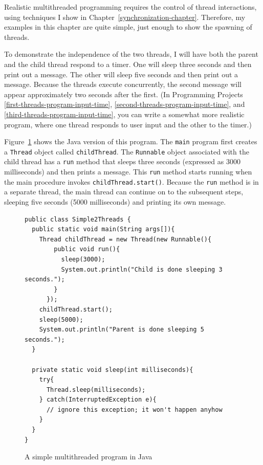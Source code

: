 Realistic multithreaded programming requires the control of thread
interactions, using techniques I show in
Chapter~\ref{synchronization-chapter}.  Therefore, my examples in
this chapter are quite simple, just enough to show the spawning of
threads.

To demonstrate the independence of the two threads, I will have both
the parent and the child thread respond to a timer.  One will sleep
three seconds and then print out a message.  The other will sleep five
seconds and then print out a message.  Because the threads execute
concurrently, the second message will appear approximately two seconds
after the first.  (In Programming Projects
\ref{first-threads-program-input-time},
\ref{second-threads-program-input-time}, and \ref{third-threads-program-input-time},
you can write a somewhat
more realistic program, where one thread responds to user input and
the other to the timer.)

Figure~\ref{Simple2Threads} shows the Java version of this program.
The \verb|main| program first creates a
\verb|Thread| object called
\verb|childThread|.  The
\verb|Runnable| object associated
with the child thread has a \verb|run| method that sleeps three
seconds (expressed as 3000
milliseconds) and then prints a message.  This \verb|run| method starts
running when the main procedure invokes \verb|childThread.start()|.
Because the \verb|run| method is in a separate thread, the main thread
can continue on to the subsequent steps, sleeping five seconds (5000 milliseconds)
and printing its own message.
\begin{figure}
\begin{verbatim}
public class Simple2Threads {
  public static void main(String args[]){
    Thread childThread = new Thread(new Runnable(){
        public void run(){
          sleep(3000);
          System.out.println("Child is done sleeping 3 seconds.");
        }
      });
    childThread.start();
    sleep(5000);
    System.out.println("Parent is done sleeping 5 seconds.");
  }

  private static void sleep(int milliseconds){
    try{
      Thread.sleep(milliseconds);
    } catch(InterruptedException e){
      // ignore this exception; it won't happen anyhow
    }
  }
}
\end{verbatim}
\caption{A simple multithreaded program in Java}
\label{Simple2Threads}
\end{figure}

